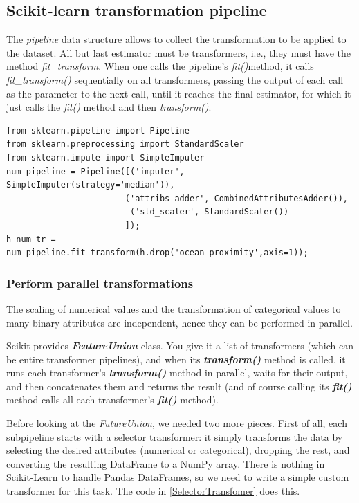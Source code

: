\documentclass[12pt, letterpaper]{article}
\theoremstyle{definition}
\let\ti\textit
\let\tb\textbf
\begin{document}
\subsection{Scikit-learn transformation pipeline}
The \ti{pipeline} data structure allows to collect the transformation to be applied to the dataset. All but last estimator must be transformers, i.e., they must have the method \ti{fit\_transform}. When one calls the pipeline's \ti{fit()}method, it calls \ti{fit\_transform()} sequentially on all transformers, passing the output of each call as the parameter to the next call, until it reaches the final estimator, for which it just calls the \ti{fit()} method and then \ti{transform()}.
\begin{lstlisting}
from sklearn.pipeline import Pipeline
from sklearn.preprocessing import StandardScaler
from sklearn.impute import SimpleImputer
num_pipeline = Pipeline([('imputer', SimpleImputer(strategy='median')),
                        ('attribs_adder', CombinedAttributesAdder()),
                         ('std_scaler', StandardScaler())
                        ]);
h_num_tr = num_pipeline.fit_transform(h.drop('ocean_proximity',axis=1));
\end{lstlisting}
\subsubsection{Perform parallel transformations}
The scaling of numerical values and the transformation of categorical values to many binary attributes are independent, hence they can be performed in parallel.

Scikit provides \ti{\tb{FeatureUnion}} class. You give it a list of transformers (which can be entire transformer pipelines), and when its \ti{\tb{transform()}} method is called, it runs each transformer’s \ti{\tb{transform()}} method in parallel, waits for their output, and then concatenates them and returns the result (and of course calling its \ti{\tb{fit()}} method calls all each transformer’s \ti{\tb{fit()}} method). 

Before looking at the \ti{FutureUnion}, we needed two more pieces. First of all, each subpipeline starts with a selector transformer: it simply transforms the data by selecting the desired attributes (numerical or categorical), dropping the rest, and converting the resulting DataFrame to a NumPy array. There is nothing in Scikit-Learn to handle Pandas DataFrames, so we need to write a simple custom transformer for this task. The code in \ref{SelectorTransfomer} does this.
\end{document}
